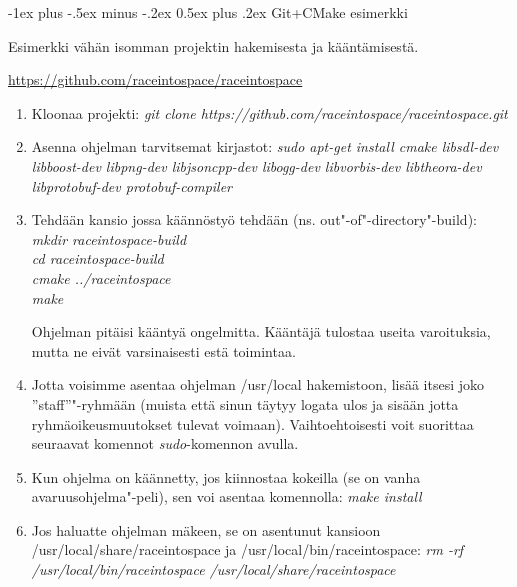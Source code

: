\documentclass[12pt,portrait,a4]{article}
\makeatletter
\renewcommand{\section}{\@startsection{section}{1}{0mm}%
                                {-1ex plus -.5ex minus -.2ex}%
                                {0.5ex plus .2ex}%
                                {\normalfont\large\bfseries}}
\makeatother
\begin{document}
\section{Git+CMake esimerkki}

Esimerkki vähän isomman projektin hakemisesta ja kääntämisestä.

\url{https://github.com/raceintospace/raceintospace}

\begin{enumerate}
\item Kloonaa projekti:
\emph{git clone https://github.com/raceintospace/raceintospace.git}
\item Asenna ohjelman tarvitsemat kirjastot:
\emph{sudo apt-get install cmake libsdl-dev libboost-dev libpng-dev
libjsoncpp-dev libogg-dev libvorbis-dev libtheora-dev libprotobuf-dev
protobuf-compiler}

\item Tehdään kansio jossa käännöstyö tehdään (ns. out"-of"-directory"-build):\\
\emph{mkdir raceintospace-build\\
cd raceintospace-build\\
cmake ../raceintospace\\
make}

Ohjelman pitäisi kääntyä ongelmitta.  Kääntäjä tulostaa useita varoituksia,
mutta ne eivät varsinaisesti estä toimintaa.

\item Jotta voisimme asentaa ohjelman /usr/local hakemistoon, lisää itsesi joko
''staff''"-ryhmään (muista että sinun täytyy logata ulos ja sisään jotta
ryhmäoikeusmuutokset tulevat voimaan).  Vaihtoehtoisesti voit suorittaa
seuraavat komennot \emph{sudo}-komennon avulla.
\item Kun ohjelma on käännetty, jos kiinnostaa kokeilla (se on vanha
avaruusohjelma"-peli), sen voi asentaa komennolla: \emph{make install}
\item Jos haluatte ohjelman mäkeen, se on asentunut kansioon
/usr/local/share/raceintospace ja /usr/local/bin/raceintospace:
\emph{rm -rf /usr/local/bin/raceintospace /usr/local/share/raceintospace}
\end{enumerate}
\end{document}
